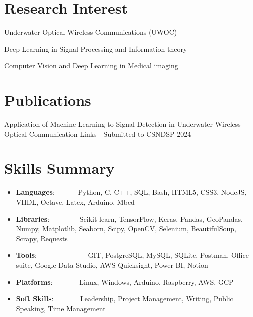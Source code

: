\documentclass[a4paper,20pt]{article}
\newcommand{\resumeItem}[2]{
  \item\small{
    \textbf{#1}{: #2 \vspace{-2pt}}
  }
}
\newcommand{\resumeSubItem}[2]{\resumeItem{#1}{#2}\vspace{-3pt}}
\newcommand{\resumeSubHeadingListStart}{\begin{itemize}[leftmargin=*]}
\newcommand{\resumeSubHeadingListEnd}{\end{itemize}}
\begin{document}
\vspace{-5pt}
\section{Research Interest}
\begin{description}[font=$\bullet$]
  \item{Underwater Optical Wireless Communications (UWOC)}
  \item{Deep Learning in Signal Processing and Information theory}
  \item{Computer Vision and Deep Learning in Medical imaging}
\end{description}

\vspace{-5pt}
\section{Publications}
\begin{description}[font=$\bullet$]
  \item{Application of Machine Learning to Signal Detection in Underwater Wireless Optical Communication Links - Submitted to CSNDSP 2024}
\end{description}

\vspace{-5pt}
\section{Skills Summary}
	\resumeSubHeadingListStart
    \resumeSubItem{Languages}{~~~~~~Python, C, C++, SQL, Bash, HTML5, CSS3, NodeJS, VHDL, Octave, Latex, Arduino, Mbed}
    \resumeSubItem{Libraries}{~~~~~~~~Scikit-learn, TensorFlow, Keras, Pandas, GeoPandas, Numpy, Matplotlib, Seaborn, Scipy, OpenCV, Selenium, BeautifulSoup, Scrapy, Requests}
    \resumeSubItem{Tools}{~~~~~~~~~~~~~~GIT, PostgreSQL, MySQL, SQLite, Postman, Office suite, Google Data Studio, AWS Quicksight, Power BI, Notion}
    \resumeSubItem{Platforms}{~~~~~~~Linux, Windows, Arduino, Raspberry, AWS, GCP}
    \resumeSubItem{Soft Skills}{~~~~~~~Leadership, Project Management, Writing, Public Speaking, Time Management}
  \resumeSubHeadingListEnd

\vspace{-5pt}
\end{document}
